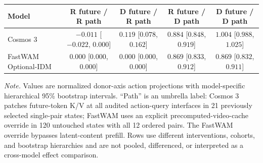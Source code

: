 \begin{tabular}{lcccc}
\toprule
Model & R future / R path & D future / R path & R future / D path & D future / D path \\
\midrule
Cosmos 3
  & $-0.011$ [$-0.022$, $0.000$]
  & $0.119$ [$0.078$, $0.162$]
  & $0.884$ [$0.848$, $0.919$]
  & $1.004$ [$0.988$, $1.025$] \\
FastWAM Optional-IDM
  & $0.000$ [$0.000$, $0.000$]
  & $0.000$ [$0.000$, $0.000$]
  & $0.869$ [$0.833$, $0.912$]
  & $0.869$ [$0.832$, $0.911$] \\
\bottomrule
\end{tabular}

\par\smallskip
{\footnotesize\textit{Note.} Values are normalized donor-axis action
projections with model-specific hierarchical 95\% bootstrap intervals.
``Path'' is an umbrella label: Cosmos 3 patches future-token K/V at all audited
action-query interfaces in 21 previously selected single-pair states; FastWAM
uses an explicit precomputed-video-cache override in 120 untouched states with
all 12 ordered pairs. The FastWAM override bypasses latent-content prefill.
Rows use different interventions, cohorts, and bootstrap hierarchies and are
not pooled, differenced, or interpreted as a cross-model effect comparison.}
